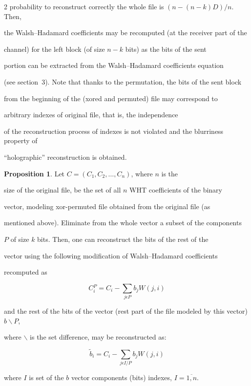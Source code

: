 \begin{multicols}{2}
probability to reconstruct correctly  the whole file is $(n-(n-k)D)/n $. Then, 

the Walsh--Hadamard coefficients  may be recomputed (at the receiver part of the 

channel)  for the left block (of size $n-k$ bits) as the bits of the sent 

portion can be extracted from the Walsh--Hadamard  coefficients equation 

(see section~3). Note that thanks to the permutation, the bits of the sent block 

from the beginning of the (xored and permuted) file may  correspond to 

arbitrary indexes of original file, that is,  the independence 

of the reconstruction process of indexes is not violated and the blurriness property of  

``holographic'' reconstruction is obtained.



\smallskip



\noindent \textbf{Proposition 1}. Let $C=(C_1,C_2,\ldots,C_n)$, where $n$ is the

size of the original file, be the set of all $n$  WHT coefficients of the binary 

vector, modeling xor-permuted file obtained from the original file (as 

mentioned above). Eliminate from the whole vector a subset of the components 

$P$ of size $k$ bits. Then, one can reconstruct the bits of the rest of the 

vector using the following modification of Walsh--Hadamard  coefficients 

recomputed as

$$

C{^P_i}=C_i- \sum\limits_{j\epsilon P} b_j W(j,i)

$$

and the rest of the bits of the vector (rest part of the file modeled by this vector) $b\backslash P$, 

where $\backslash$ is the set difference, may be reconstructed as:

$$

\tilde b_i =C_i- \sum\limits_{j\epsilon I/P} b_j W(j,i)

$$

where $I$ is set of the $b$ vector components (bits) indexes, $I=\overline{1,n}$.


\end{multicols}
